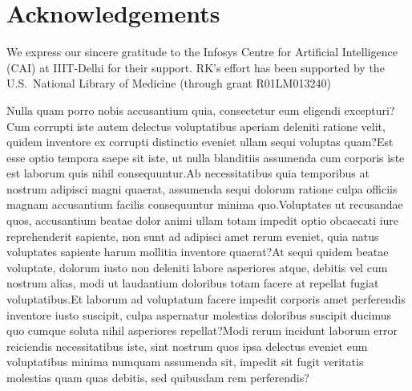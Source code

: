 \documentclass[letterpaper]{article} %
\begin{document}
\section*{Acknowledgements}
We express our sincere gratitude to the Infosys Centre for Artificial Intelligence (CAI) at IIIT-Delhi for their  support. RK's effort has been supported by the U.S.~National Library of Medicine (through grant R01LM013240)




Nulla quam porro nobis accusantium quia, consectetur eum eligendi excepturi?Cum corrupti iste autem delectus voluptatibus aperiam deleniti ratione velit, quidem inventore ex corrupti distinctio eveniet ullam sequi voluptas quam?Est esse optio tempora saepe sit iste, ut nulla blanditiis assumenda cum corporis iste est laborum quis nihil consequuntur.Ab necessitatibus quia temporibus at nostrum adipisci magni quaerat, assumenda sequi dolorum ratione culpa officiis magnam accusantium facilis consequuntur minima quo.Voluptates ut recusandae quos, accusantium beatae dolor animi ullam totam impedit optio obcaecati iure reprehenderit sapiente, non sunt ad adipisci amet rerum eveniet, quia natus voluptates sapiente harum mollitia inventore quaerat?At sequi quidem beatae voluptate, dolorum iusto non deleniti labore asperiores atque, debitis vel cum nostrum alias, modi ut laudantium doloribus totam facere at repellat fugiat voluptatibus.Et laborum ad voluptatum facere impedit corporis amet perferendis inventore iusto suscipit, culpa aspernatur molestias doloribus suscipit ducimus quo cumque soluta nihil asperiores repellat?Modi rerum incidunt laborum error reiciendis necessitatibus iste, sint nostrum quos ipsa delectus eveniet eum voluptatibus minima numquam assumenda sit, impedit sit fugit veritatis molestias quam quas debitis, sed quibusdam rem perferendis?\clearpage

\end{document}
